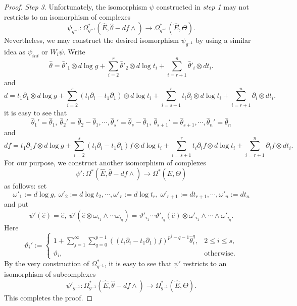 \documentclass[10pt,a4paper]{amsart}
\begin{document}
\begin{proof}
\emph{Step 3}. Unfortunately, the isomorphism $\psi$ constructed in \emph{step 1} may not restricts to an isomorphism of complexes 
$$\psi_{g^{-1}}:\Omega^*_{g^{-1}}(\hat E,\hat\theta-df\wedge)\to\Omega^*_{g^{-1}}(\hat E,\Theta).$$
Nevertheless, we may construct the desired isomorphism $\psi_{g^{-1}}$ by using a similar idea as $\psi_{int}$ or $W_i\psi$. Write
$$
\hat\theta=\hat\theta'_1\otimes d\log g+\sum_{i=2}^r\hat\theta'_2\otimes d\log t_i+\sum_{i=r+1}^n\hat \theta'_i\otimes dt_i.
$$
and
$$
d=t_1\partial_1\otimes d\log g+\sum_{i=2}^s(t_i\partial_i-t_1\partial_1)\otimes d\log t_i+\sum_{i=s+1}^rt_i\partial_i\otimes d\log t_i+\sum_{i=r+1}^n\partial_i\otimes dt_i.
$$
it is easy to see that
$$
\hat\theta_1'=\hat\theta_1,~\hat\theta_2'=\hat\theta_2-\hat\theta_1,\cdots,\hat\theta_s'=\hat\theta_s-\hat\theta_1,~\hat\theta_{s+1}'=\hat\theta_{s+1},\cdots,\hat\theta_n'=\hat\theta_n
$$
and 
$$
df=t_1\partial_1f\otimes d\log g+\sum_{i=2}^s(t_i\partial_i-t_1\partial_1)f\otimes d\log t_i+\sum_{i=s+1}^rt_i\partial_if\otimes d\log t_i+\sum_{i=r+1}^n\partial_if\otimes dt_i.
$$
For our purpose, we construct another isomorphism of complexes 
$$
\psi':\Omega^*(\hat E,\hat\theta-df\wedge)\to\Omega^*(\hat E,\Theta) 
$$
as follows: set
$$
\omega'_1:=d\log g,~\omega'_2:=d\log t_2,\cdots,\omega'_r:=d\log t_r,~\omega'_{r+1}:=dt_{r+1},\cdots,\omega'_n:=dt_n
$$
and put
$$
\psi'(\hat e)=\hat e,~\psi'(\hat e\otimes\omega_{i_1}\wedge\cdots\omega_{i_q})=\vartheta'_{i_1}\cdots\vartheta'_{i_q}(\hat e)\otimes\omega'_{i_1}\wedge\cdots\wedge\omega'_{i_q}.
$$
Here 
$$
\vartheta_i':=\left\{
\begin{matrix}
1+\sum_{j=1}^\infty\sum_{q=0}^{p-1}((t_i\partial_i-t_1\partial_1) f)^{p^j-q-1}\hat\theta_i^q,&2\leq i\leq s,\\
\vartheta_i,&\mathrm{otherwise}.
\end{matrix}
\right.
$$
By the very construction of $\Omega^*_{g^{-1}}$, it is easy to see that $\psi'$ restricts to an isomorphism of subcomplexes 
$$
\psi'_{g^{-1}}:\Omega^*_{g^{-1}}(\hat E,\hat\theta-df\wedge)\to\Omega^*_{g^{-1}}(\hat E,\Theta).
$$
This completes the proof. 
\end{proof}
\end{document}
